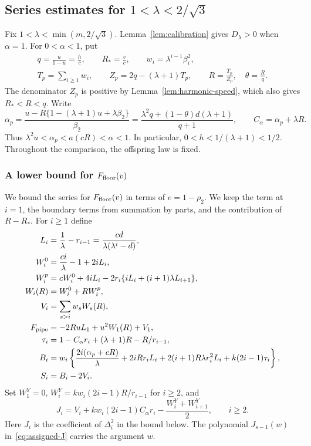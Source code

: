 \subsection{Series estimates for \texorpdfstring{$1<\lambda<2/\sqrt3$}{1 < lambda < 2/sqrt(3)}}
\label{subsec:low-computer-region}
Fix $1<\lambda<\min(m,2/\sqrt3)$. Lemma~\ref{lem:calibration}
gives $D_\lambda>0$ when $\alpha=1$. For $0<\alpha<1$, put
\[\begin{gathered}
 q=\frac{u}{1-u}=\frac hc,\qquad R_* =\frac vc,\qquad
 w_i=\lambda^{i-1}\beta_i^2,\\
 T_p=\sum_{i\ge1}w_i,\qquad Z_p=2q-(\lambda+1)T_p,\qquad
 R=\frac{T_p}{Z_p},\quad \theta=\frac Rq.
\end{gathered}\]
The denominator $Z_p$ is positive by
Lemma~\ref{lem:harmonic-speed}, which also gives $R_*<R<q$.
Write
\begin{equation}\label{eq:low-reference-calibration}
 \alpha_p=\frac{u-R\{1-(\lambda+1)u+\lambda\beta_2\}}{\beta_2}
 =\frac{\lambda^2q+(1-\theta)d(\lambda+1)}{q+1},
 \qquad C_\alpha=\alpha_p+\lambda R.
\end{equation}
Thus $\lambda^2u<\alpha_p<a(cR)<\alpha<1$.  In particular,
$0<h<1/(\lambda+1)<1/2$. Throughout the comparison, the offspring
law is fixed.

\subsubsection{A lower bound for \texorpdfstring{$F_{\rm floor}(v)$}{the moment series at v}}
We bound the series for $F_{\rm floor}(v)$ in terms of
$e=1-\rho_2$. We keep the term at $i=1$, the boundary terms from
summation by parts, and the contribution of $R-R_*$.
For $i\ge1$ define
\begin{align}
 L_i&=\frac1\lambda-r_{i-1}
       =\frac{cd}{\lambda(\lambda^i-d)},\nonumber\\
 W_i^0&=\frac{ci}{\lambda}-1+2iL_i,\nonumber\\
 W_i^p&=cW_i^0+4iL_i
       -2r_i\{iL_i+(i+1)\lambda L_{i+1}\},
 \nonumber\\
 W_i(R)&=W_i^0+RW_i^p,\label{eq:low-W}\\
 V_i&=\sum_{s>i}w_sW_s(R),
 \nonumber\\
 F_{\rm pipe}&=-2RuL_1+u^2W_1(R)+V_1,\nonumber\\
 \tau_i&=1-C_\alpha r_i+(\lambda+1)R-R/r_{i-1},\nonumber\\
 B_i&=w_i\left\{\frac{2i(\alpha_p+cR)}\lambda
       +2iRr_iL_i+2(i+1)R\lambda r_i^2L_i
       +k(2i-1)\tau_i\right\},
 \nonumber\\
 S_i&=B_i-2V_i.\label{eq:low-B-S}
\end{align}
Set $W_1^Y=0$, $W_i^Y=k w_i(2i-1)R/r_{i-1}$ for $i\ge2$, and
\begin{equation}\label{eq:low-J}
 J_i=V_i+k w_i(2i-1)C_\alpha r_i
                         -\frac{W_i^Y+W_{i+1}^Y}{2},\qquad i\ge2.
\end{equation}
Here $J_i$ is the coefficient of $\Delta_i^2$ in the bound below.
The polynomial $J_{s-1}(w)$ in~\eqref{eq:assigned-J} carries the
argument $w$.

